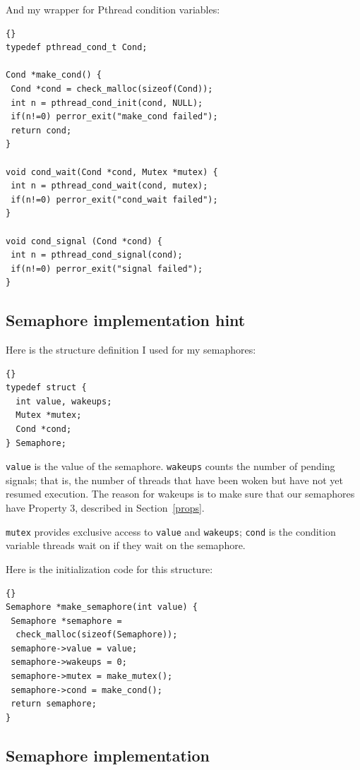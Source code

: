 \documentclass{book}
\begin{document}
\newpage
And my wrapper for Pthread condition variables:

\begin{lstlisting}[title={}]{}
typedef pthread_cond_t Cond;

Cond *make_cond() {
 Cond *cond = check_malloc(sizeof(Cond)); 
 int n = pthread_cond_init(cond, NULL);
 if(n!=0) perror_exit("make_cond failed");
 return cond;
}

void cond_wait(Cond *cond, Mutex *mutex) {
 int n = pthread_cond_wait(cond, mutex);
 if(n!=0) perror_exit("cond_wait failed");
}

void cond_signal (Cond *cond) {
 int n = pthread_cond_signal(cond);
 if(n!=0) perror_exit("signal failed");
}
\end{lstlisting}




\subsection{Semaphore implementation hint}

Here is the structure definition I used for my semaphores:

\newpage
\begin{lstlisting}[title={}]{}
typedef struct {
  int value, wakeups;
  Mutex *mutex;
  Cond *cond;
} Semaphore;
\end{lstlisting}

{\tt value} is the value of the semaphore.  {\tt wakeups} counts
the number of pending signals; that is, the number of threads
that have been woken but have not yet resumed execution.  The reason
for wakeups is to make sure that our semaphores have
Property 3, described in Section~\ref{props}.

{\tt mutex} provides exclusive access to {\tt value} and
    {\tt wakeups}; {\tt cond} is the condition variable threads
wait on if they wait on the semaphore.

Here is the initialization code for this structure:

\pagebreak
\begin{lstlisting}[title={}]{}
Semaphore *make_semaphore(int value) {
 Semaphore *semaphore = 
  check_malloc(sizeof(Semaphore));
 semaphore->value = value;
 semaphore->wakeups = 0;
 semaphore->mutex = make_mutex();
 semaphore->cond = make_cond();
 return semaphore;
}
\end{lstlisting}



\subsection{Semaphore implementation}
\end{document}
